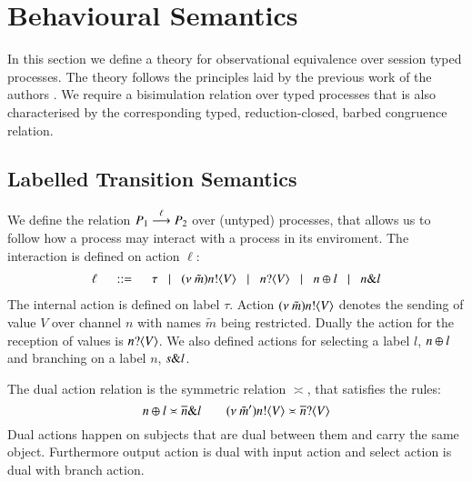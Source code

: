 \section{Behavioural Semantics}
\label{sec:beh_sem}

In this section we define a theory for observational equivalence over
session typed \HOp processes. The theory follows the principles
laid by the previous work of the authors
\cite{DBLP:conf/forte/KouzapasYH11,KY13,dkphdthesis}.
We require a bisimulation relation over typed processes that
is also characterised by the corresponding typed, reduction-closed,
barbed congruence relation.


\subsection{Labelled Transition Semantics}\label{ss:lts}

We define the relation $P_1 \stackrel{\ell}{\longrightarrow} P_2$ over
(untyped) processes, that allows us to follow how a process may
interact with a process in its enviroment. The interaction
is defined on action $\ell$:
%
\[
	\begin{array}{rcl}
		\ell	& \;\;::=\;\;  & \tau 
		\;\;\;|\;\;\; (\nu\ \tilde{m}) n ! \langle V \rangle 
		\;\;\;|\;\;\;n ? \langle V \rangle 
		\;\;\;|\;\;\; n \oplus l 
		\;\;\;|\;\;\; n \& l 
	\end{array}
\]
%
\noi The internal action is defined on label $\tau$.
Action $(\nu\ \tilde{m}) n ! \langle V \rangle$ denotes the sending of value $V$ over channel $n$ with
names $\tilde{m}$ being restricted.
Dually the action for the reception of values is 
$n ? \langle V \rangle$.
We also defined actions for selecting a label $l$, $n \oplus l$ and branching on a label
$n$, $s \& l$.

The dual action relation is the symmetric relation $\asymp$, that satisfies the rules:
%
\[
	n \oplus l \asymp \overline{n} \& l
	\qquad
	(\nu\ \tilde{m}') n ! \langle V \rangle \asymp \overline{n} ? \langle V \rangle
\]
%
Dual actions happen on subjects that are dual between them and carry the same
object. Furthermore output action is dual with input action and 
select action is dual with branch action.



